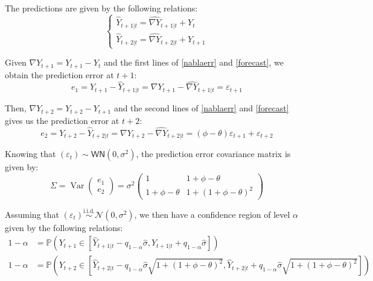 \documentclass[12pt]{article}
\DeclareMathOperator*{\Var}{Var}
\newcommand{\WN}{\textsf{WN}}
\newcommand{\iidsim}{\overset{\text{i.i.d.}}{\sim}}
\begin{document}
\begin{enumerate}
        The predictions are given by the following relations:
        \begin{equation} \label{forecast}            
        \begin{cases}
            \widehat{Y}_{t+1|t}=\widehat{\nabla Y}_{t+1|t} + Y_t \\
            \widehat{Y}_{t+2|t}=\widehat{\nabla Y}_{t+2|t} + Y_{t+1}
        \end{cases}
        \end{equation}
        
        Given $\nabla Y_{t+1} = Y_{t+1}-Y_t$ and the first lines of \eqref{nablaerr} and \eqref{forecast}, we obtain the prediction error at $t+1$:
        \[ e_1 = Y_{t+1}-\widehat{Y}_{t+1|t}=\nabla Y_{t+1} - \widehat{\nabla Y}_{t+1|t} = \varepsilon_{t+1} \]

        Then, $\nabla Y_{t+2} = Y_{t+2} - Y_{t+1}$ and the second lines of \eqref{nablaerr} and \eqref{forecast} gives us the prediction error at $t+2$:
        \[ e_2 = Y_{t+2} - \widehat{Y}_{t+2|t} = \nabla Y_{t+2} - \widehat{\nabla Y}_{t+2|t} = (\phi -\theta)\varepsilon_{t+1} + \varepsilon_{t+2} \]

        Knowing that $(\varepsilon_t) \sim \WN(0, \sigma^2)$, the prediction error covariance matrix is given by:
        \[\Sigma = \Var\begin{pmatrix} e_1 \\ e_2\end{pmatrix} = \sigma^2\begin{pmatrix}
            1 & 1 + \phi - \theta \\
            1 + \phi - \theta & 1 + (1 + \phi - \theta)^2
        \end{pmatrix} \]

        Assuming that $(\varepsilon_t) \iidsim \mathcal{N}(0, \sigma^2)$, we then have a confidence region of level $\alpha$ given by the following relations:
        \begin{align*}
            1-\alpha&=\mathbb{P}\left(Y_{t+1}\in\left[\widehat{Y}_{t+1|t} - q_{1-\alpha}\hat\sigma, \widehat{Y}_{t+1|t} + q_{1-\alpha}\hat\sigma\right]\right) \\
            1-\alpha&=\mathbb{P}\left(Y_{t+2}\in\left[\widehat{Y}_{t+2|t} - q_{1-\alpha}\hat\sigma \sqrt{ 1 + (1 + \phi - \theta)^2}, \widehat{Y}_{t+2|t} + q_{1-\alpha}\hat\sigma \sqrt{ 1 + (1 + \phi - \theta)^2}\right]\right)
        \end{align*}


\end{enumerate}
\end{document}
